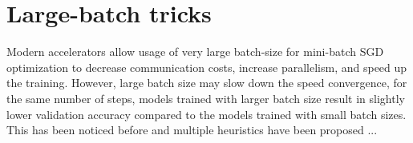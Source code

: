 % 



\section{Large-batch tricks} \label{sec: large-batch}

Modern accelerators allow usage of very large batch-size for mini-batch SGD optimization to decrease communication costs, increase parallelism, and speed up the training. However, large batch size may slow down the speed convergence, for the same number of steps, models trained with larger batch size result in slightly lower validation accuracy compared to the models trained with small batch sizes. This has been noticed before and multiple heuristics have been proposed ...

